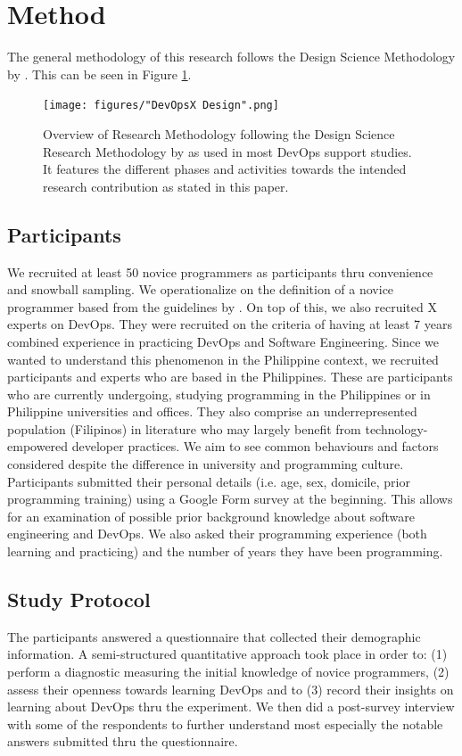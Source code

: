 \documentclass{sigchi}
\begin{document}
\section{Method}
The general methodology of this research follows the Design Science Methodology by \cite{peffers2007design}. This can be seen in Figure \ref{fig:framework}. 
\begin{figure}
    \centering
    \texttt{[image: figures/"DevOpsX Design".png]}
    \caption{Overview of Research Methodology following the Design Science Research Methodology by \cite{peffers2007design} as used in most DevOps support studies. It features the different phases and activities towards the intended research contribution as stated in this paper.}
    \label{fig:framework}
\end{figure}

\subsection{Participants}
We recruited at least 50 novice programmers as participants thru convenience and snowball sampling. We operationalize on the definition of a novice programmer based from the guidelines by \cite{teague2014longitudinal}. On top of this, we also recruited X experts on DevOps. They were recruited on the criteria of having at least 7 years combined experience in practicing DevOps and Software Engineering. Since we wanted to understand this phenomenon in the Philippine context, we recruited participants and experts who are based in the Philippines. These are participants who are currently undergoing, studying programming in the Philippines or in Philippine universities and offices. They also comprise an underrepresented population (Filipinos) in literature who may largely benefit from technology-empowered developer practices. We aim to see common behaviours and factors considered despite the difference in university and programming culture. Participants submitted their personal details (i.e. age, sex, domicile, prior programming training) using a Google Form survey at the beginning. This allows for an examination of possible prior background knowledge about software engineering and DevOps. We also asked their programming experience (both learning and practicing) and the number of years they have been programming. 

\subsection{Study Protocol}
The participants answered a questionnaire that collected their demographic information. A semi-structured quantitative approach took place in order to: (1) perform a diagnostic measuring the initial knowledge of novice programmers, (2) assess their openness towards learning DevOps and to (3) record their insights on learning about DevOps thru the experiment. We then did a post-survey interview with some of the respondents to further understand most especially the notable answers submitted thru the questionnaire. 
\end{document}
